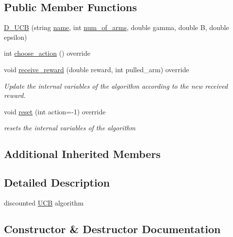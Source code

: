 \subsection*{Public Member Functions}
\begin{DoxyCompactItemize}
\item 
\mbox{\hyperlink{class_d___u_c_b_adc6258dbbe7449d0ec6b7b7bb3ae88e8}{D\+\_\+\+U\+CB}} (string \mbox{\hyperlink{class_m_a_b_algorithm_a77b10ecc4b49d519c557f65358167b82}{name}}, int \mbox{\hyperlink{class_m_a_b_algorithm_a340fa9e83e85b092f2c6125fc4e8549b}{num\+\_\+of\+\_\+arms}}, double gamma, double B, double epsilon)
\item 
int \mbox{\hyperlink{class_d___u_c_b_ac48b99c21eb02361707988f6ac012408}{choose\+\_\+action}} () override
\item 
void \mbox{\hyperlink{class_d___u_c_b_a23b79f3f23095ae6e824b36a3856ff7c}{receive\+\_\+reward}} (double reward, int pulled\+\_\+arm) override
\begin{DoxyCompactList}\small\item\em Update the internal variables of the algorithm according to the new received reward. \end{DoxyCompactList}\item 
void \mbox{\hyperlink{class_d___u_c_b_a454ffcd1e17989f0b049790cfc5fc515}{reset}} (int action=-\/1) override
\begin{DoxyCompactList}\small\item\em resets the internal variables of the algorithm \end{DoxyCompactList}\end{DoxyCompactItemize}
\subsection*{Additional Inherited Members}


\subsection{Detailed Description}
discounted \mbox{\hyperlink{class_u_c_b}{U\+CB}} algorithm 

\subsection{Constructor \& Destructor Documentation}
\mbox{\label{class_d___u_c_b_adc6258dbbe7449d0ec6b7b7bb3ae88e8}} 
